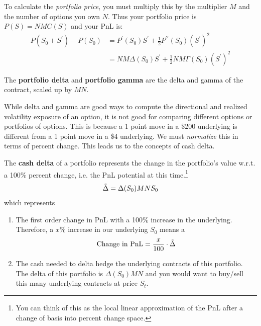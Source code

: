 \documentclass{article}
\begin{document}
    To calculate the \textit{portfolio price}, you must multiply this by the multiplier $M$ and the number of options you own $N$. Thus your portfolio price is $P(S) = N M C(S)$ and your PnL is: 
    \begin{align}
      P(S_0 + S^\prime) - P(S_0) & = P^\prime (S_0) S^\prime + \frac{1}{2} P^{\prime\prime} (S_0) (S^\prime)^2 \\
                                 & = N M \Delta(S_0) S^\prime + \frac{1}{2} N M \Gamma(S_0) (S^\prime)^2
    \end{align}

    \begin{definition}
      The \textbf{portfolio delta} and \textbf{portfolio gamma} are the delta and gamma of the contract, scaled up by $MN$.
    \end{definition}

    While delta and gamma are good ways to compute the directional and realized volatility exposure of an option, it is not good for comparing different options or portfolios of options. This is because a 1 point move in a \$200 underlying is different from a 1 point move in a \$4 underlying. We must \textit{normalize} this in terms of percent change. This leads us to the concepts of cash delta. 

    \begin{definition}
      The \textbf{cash delta} of a portfolio represents the change in the portfolio's value w.r.t. a 100\% percent change, i.e. the PnL potential at this time.\footnote{You can think of this as the local linear approximation of the PnL after a change of basis into percent change space. }
      \begin{equation}
        \Tilde{\Delta} = \Delta(S_0) M N S_0 
      \end{equation}
      which represents
      \begin{enumerate}
        \item The first order change in PnL with a 100\% increase in the underlying. Therefore, a $x\%$ increase in our underlying $S_0$ means a
          \begin{equation}
            \text{Change in PnL} = \frac{x}{100} \cdot \Tilde{\Delta}
          \end{equation}
        \item The cash needed to delta hedge the underlying contracts of this portfolio. The delta of this portfolio is $\Delta(S_0) M N$ and you would want to buy/sell this many underlying contracts at price $S_t$.
      \end{enumerate}
    \end{definition}
\end{document}
